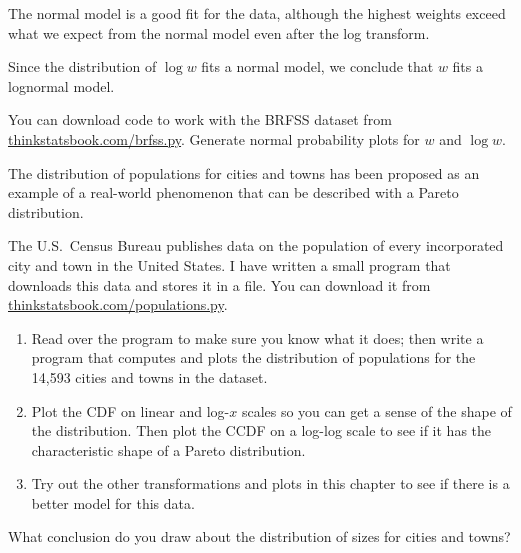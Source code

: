 \documentclass[12pt]{book}
\begin{document}
The normal model is a good fit for the data, although the
highest weights exceed what we expect from the normal model even after
the log transform.

Since the distribution of $\log w$ fits a normal model, we conclude that 
$w$ fits a lognormal model.

\begin{ex}

You can download code to work with the BRFSS dataset from
\url{thinkstatsbook.com/brfss.py}.  Generate normal probability plots
  for $w$ and $\log w$.

\end{ex}

\begin{ex}

The distribution of populations for cities and towns has been proposed
as an example of a real-world phenomenon that can be described
with a Pareto distribution.

The U.S.~Census Bureau publishes data on the population of every
incorporated city and town in the United States.  I have written a
small program that downloads this data and stores it in a file.  You
can download it from \url{thinkstatsbook.com/populations.py}.

\begin{enumerate}

\item Read over the program to make sure you know what it does; then
  write a program that computes and plots the distribution of
  populations for the 14,593 cities and towns in the dataset.

\item Plot the CDF on linear and log-$x$ scales so you can get a sense
  of the shape of the distribution.  Then plot the CCDF on a log-log
  scale to see if it has the characteristic shape of a Pareto
  distribution.

\item Try out the other transformations and plots in this chapter to
  see if there is a better model for this data.

\end{enumerate}

What conclusion do you draw about the distribution of sizes
for cities and towns?

\end{ex}
\end{document}
